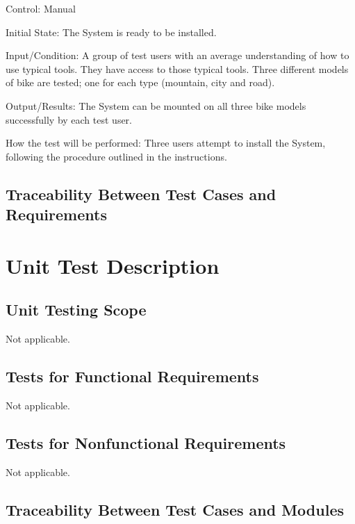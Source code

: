 \documentclass[12pt, titlepage]{article}
\begin{document}
\begin{enumerate}
Control: Manual 

Initial State: The System is ready to be installed. 

Input/Condition: A group of test users with an average understanding of how to use typical tools. They have access to those typical tools. Three different models of bike are tested; one for each type (mountain, city and road). 

Output/Results: The System can be mounted on all three bike models successfully by each test user. 

How the test will be performed: Three users attempt to install the System, following the procedure outlined in the instructions.  

\end{enumerate}

\subsection{Traceability Between Test Cases and Requirements}


\section{Unit Test Description}
\label{Section 6}

\subsection{Unit Testing Scope}

Not applicable.

\subsection{Tests for Functional Requirements}

Not applicable.

\subsection{Tests for Nonfunctional Requirements}

Not applicable.

\subsection{Traceability Between Test Cases and Modules}
\end{document}
